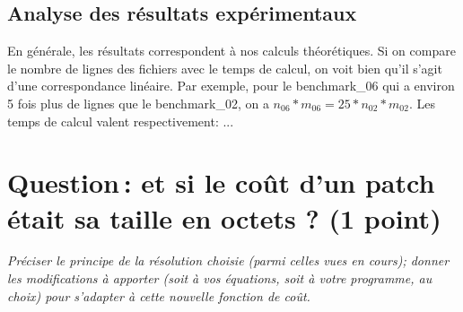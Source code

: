 \documentclass[a4paper, 10pt, english]{article}
\begin{document}
\subsection{Analyse des résultats expérimentaux}
En générale, les résultats correspondent à nos calculs théorétiques. Si on compare le nombre de lignes des fichiers avec le temps de calcul,
on voit bien qu'il s'agit d'une correspondance linéaire. Par exemple, pour le benchmark\_06 qui a environ 5 fois plus de lignes que le benchmark\_02, on a
$n_{06}*m_{06} = 25 * n_{02}*m_{02}$. Les temps de calcul valent respectivement: ...
\\



\section{Question\,: et  si le coût d'un patch était sa taille en octets ? (1 point)}
{\em Préciser le principe de la résolution choisie (parmi celles vues en cours); donner  les modifications à apporter (soit à vos  équations, soit à votre programme, au choix) 
pour s'adapter à cette nouvelle fonction de coût. 
}
\end{document}
